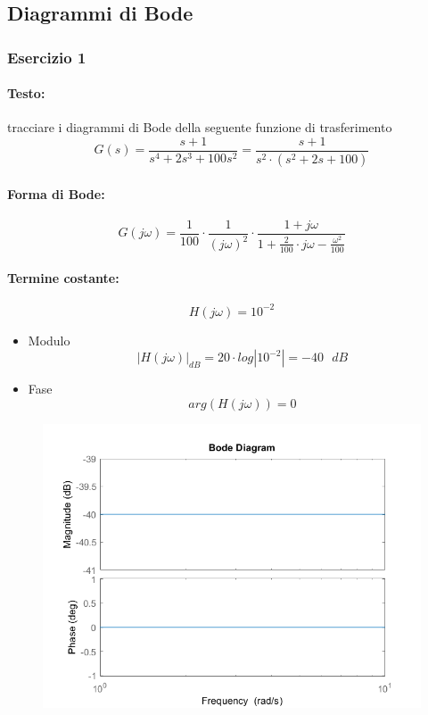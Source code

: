 \documentclass[a4paper]{article}
\begin{document}
	
	\subsection{Diagrammi di Bode}
	
	\subsubsection{Esercizio 1}
	\paragraph{Testo:}
	tracciare i diagrammi di Bode della seguente funzione di trasferimento
	\[ G(s) = \frac{s+1}{s^4 + 2s^3 + 100s^2} = \frac{s+1}{s^2 \cdot (s^2 + 2s + 100)} \]
	
	\paragraph{Forma di Bode:}
	\[ G(j\omega) = \frac{1}{100} \cdot \frac{1}{(j\omega)^2} \cdot \frac{1+j\omega}{1 + \frac{2}{100} \cdot j\omega - \frac{\omega^2}{100}} \]
	
	\paragraph{Termine costante:}
	\[ H(j\omega)= 10^{-2} \]
	\begin{itemize}
		\item Modulo
			\[ |H(j\omega)|_{dB} = 20 \cdot log|10^{-2}| = -40 \text{ } dB \]
		\item Fase
			\[ arg(H(j\omega)) = 0 \]
	\end{itemize}
	\begin{figure}[h]
		\centering
		\includegraphics[scale=0.5]{costante}
		\label{fig:costante}
	\end{figure}
	
\end{document}
